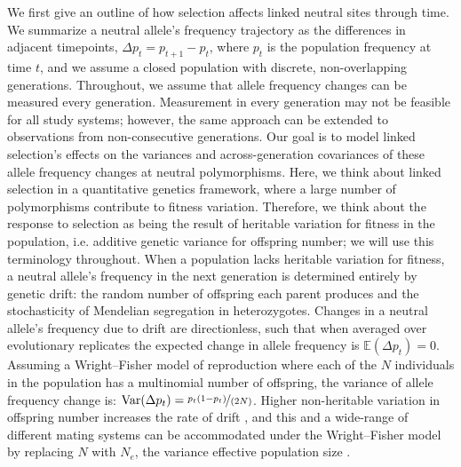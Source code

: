 \documentclass[11pt]{article}
\newcommand{\E}{\mathbb{E}}
\DeclareMathOperator{\var}{Var}
\begin{document}
We first give an outline of how selection affects linked neutral sites through
time. We summarize a neutral allele's frequency trajectory as the differences
in adjacent timepoints, $\Delta p_t = p_{t+1} - p_t$, where $p_t$ is the
population frequency at time $t$, and we assume a closed population with
discrete, non-overlapping generations. Throughout, we assume that allele
frequency changes can be measured every generation. Measurement in every
generation may not be feasible for all study systems; however, the same
approach can be extended to observations from non-consecutive generations. Our
goal is to model linked selection's effects on the variances and
across-generation covariances of these allele frequency changes at neutral
polymorphisms. Here, we think about linked selection in a quantitative genetics
framework, where a large number of polymorphisms contribute to fitness
variation. Therefore, we think about the response to selection as being the
result of heritable variation for fitness in the population, i.e. additive
genetic variance for offspring number; we will use this terminology
throughout. When a population lacks heritable variation for fitness, a neutral
allele's frequency in the next generation is determined entirely by genetic
drift: the random number of offspring each parent produces and the
stochasticity of Mendelian segregation in heterozygotes. Changes in a neutral
allele's frequency due to drift are directionless, such that when averaged over
evolutionary replicates the expected change in allele frequency is $\E(\Delta
p_t) = 0$. Assuming a Wright--Fisher model of reproduction where each of the $N$
individuals in the population has a multinomial number of offspring, the
variance of allele frequency change is: $\var(\Delta p_t) =
\nicefrac{p_t(1-p_t)}{(2N)}$. Higher non-heritable variation in offspring
number increases the rate of drift \parencite{Wright1938-tv}, and this and a
wide-range of different mating systems can be accommodated under the
Wright--Fisher model by replacing $N$ with $N_e$, the variance effective
population size \parencite{Crow1970-wm,Charlesworth2009-sg}. 
\end{document}
